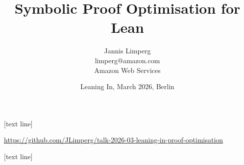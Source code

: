 
\renewcommand{\iff}{\leftrightarrow}
\newcommand{\com}{,\,}
\renewcommand{\emph}[1]{\orange{#1}}
\newcommand{\emphbox}[1]{%
    \colorlet{currentcolor}{.}%
    {\color{csorange}\fbox{\color{currentcolor}#1}}%
}
\newcommand{\mvar}[1]{\ensuremath{\mathit{?#1}}}
\newcommand{\rulename}[1]{\textrm{#1}}
\newcommand{\rulelabel}[1]{\quad \text{\rulename{#1}}}
\newcommand{\Expr}{\ensuremath{\mathbb{E}}}
\newcommand{\Hyps}{\ensuremath{\mathbb{H}}}
\newcommand{\Matches}{\ensuremath{\mathbb{M}}}
\newcommand{\Slots}{\ensuremath{\mathbb{S}}}
\newcommand{\Vars}{\ensuremath{\mathbb{V}}}
\newcommand{\Pow}[1]{\ensuremath{\mathcal{P}(#1)}}
\newcommand{\dom}[1]{\ensuremath{\mathrm{dom}(#1)}}
\newcommand{\cod}[1]{\ensuremath{\mathrm{cod}(#1)}}
\newcommand{\pre}{\ensuremath{\mathrm{pre}}}
\newcommand{\post}{\ensuremath{\mathrm{post}}}



\title{Symbolic Proof Optimisation for Lean}
\author{Jannis Limperg\\limperg@amazon.com\\Amazon Web Services}
\date{Leaning In, March 2026, Berlin}

[text line]{\parbox{\textwidth}{\centering \url{https://github.com/JLimperg/talk-2026-03-leaning-in-proof-optimisation} \medskip}}

\begin{frame}
  \maketitle
\end{frame}

[text line]{\parbox{\textwidth}{\centering \insertframenumber\medskip}}


